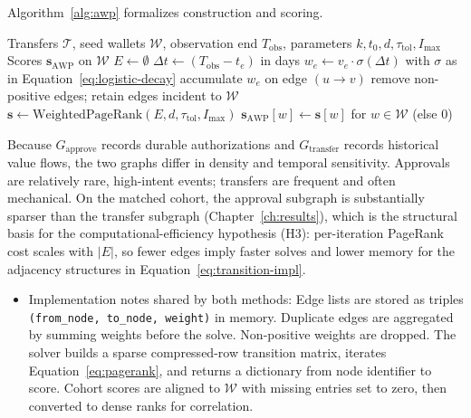 Algorithm~\ref{alg:awp} formalizes construction and scoring.

\begin{algorithm}[htbp]
\caption{AWP graph construction and scoring}
\label{alg:awp}
\begin{algorithmic}[1]
\Require Transfers $\mathcal{T}$, seed wallets $\mathcal{W}$, observation end $T_{\mathrm{obs}}$, parameters $k,t_0,d,\tau_{\mathrm{tol}},I_{\max}$
\Ensure Scores $\mathbf{s}_{\mathrm{AWP}}$ on $\mathcal{W}$
\State $E \gets \emptyset$
  \State $\Delta t \gets (T_{\mathrm{obs}}-t_e)$ in days
  \State $w_e \gets v_e\cdot\sigma(\Delta t)$ with $\sigma$ as in Equation~\eqref{eq:logistic-decay}
  \State accumulate $w_e$ on edge $(u\to v)$
\EndFor
\State remove non-positive edges; retain edges incident to $\mathcal{W}$
\State $\mathbf{s} \gets \mathrm{WeightedPageRank}(E, d, \tau_{\mathrm{tol}}, I_{\max})$
\State \Return $\mathbf{s}_{\mathrm{AWP}}[w] \gets \mathbf{s}[w]$ for $w\in\mathcal{W}$ (else $0$)
\end{algorithmic}
\end{algorithm}

Because $G_{\mathrm{approve}}$ records durable authorizations and $G_{\mathrm{transfer}}$ records historical value flows, the two graphs differ in density and temporal sensitivity. Approvals are relatively rare, high-intent events; transfers are frequent and often mechanical. On the matched cohort, the approval subgraph is substantially sparser than the transfer subgraph (Chapter~\ref{ch:results}), which is the structural basis for the computational-efficiency hypothesis (H3): per-iteration PageRank cost scales with $|E|$, so fewer edges imply faster solves and lower memory for the adjacency structures in Equation~\eqref{eq:transition-impl}.

\begin{itemize}
\item Implementation notes shared by both methods: Edge lists are stored as triples \texttt{(from\_node, to\_node, weight)} in memory. Duplicate edges are aggregated by summing weights before the solve. Non-positive weights are dropped. The solver builds a sparse compressed-row transition matrix, iterates Equation~\eqref{eq:pagerank}, and returns a dictionary from node identifier to score. Cohort scores are aligned to $\mathcal{W}$ with missing entries set to zero, then converted to dense ranks for correlation.

\end{itemize}

